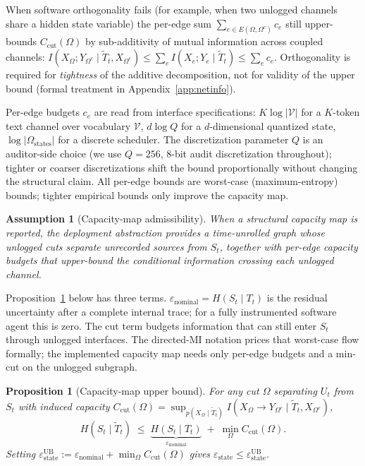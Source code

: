 \documentclass{article}
\newtheorem{proposition}{Proposition}
\newtheorem{assumption}{Assumption}
\begin{document}
  When software orthogonality fails (for example, when two unlogged channels
  share a hidden state variable) the per-edge sum $\sum_{e \in E(\Omega,
  \Omega^c)} c_e$ still upper-bounds $C_\text{cut}(\Omega)$ by sub-additivity of
   mutual information across coupled channels: $I(X_\Omega; Y_{\Omega^c} \mid
  \tilde T_t, X_{\Omega^c}) \leq \sum_e I(X_e; Y_e \mid \tilde T_t) \leq \sum_e
  c_e$. Orthogonality is required for \emph{tightness} of the additive
  decomposition, not for validity of the upper bound (formal treatment in
  Appendix~\ref{app:netinfo}).

  Per-edge budgets $c_e$ are read from interface specifications: $K \log
  |\mathcal{V}|$ for a $K$-token text channel over vocabulary $\mathcal{V}$, $d
  \log Q$ for a $d$-dimensional quantized state, $\log |\Omega_\text{states}|$
  for a discrete scheduler. The discretization parameter $Q$ is an auditor-side
  choice (we use $Q=256$, 8-bit audit discretization throughout); tighter or
  coarser discretizations shift the bound proportionally without changing the
  structural claim. All per-edge bounds are worst-case (maximum-entropy) bounds;
  tighter empirical bounds only improve the capacity map.

  \begin{assumption}[Capacity-map admissibility]
  When a structural capacity map is reported, the deployment abstraction provides
  a time-unrolled graph whose unlogged cuts separate unrecorded sources from
  $S_t$, together with per-edge capacity budgets that upper-bound the conditional
  information crossing each unlogged channel.
  \end{assumption}

  Proposition~\ref{prop:static-ub} below has three terms.
  $\varepsilon_\text{nominal} = H(S_t \mid T_t)$ is the residual uncertainty
  after a complete internal trace; for a fully instrumented software agent this
  is zero. The cut term budgets information that can still enter $S_t$ through
  unlogged interfaces. The directed-MI notation prices that worst-case flow
  formally; the implemented capacity map needs only per-edge budgets and a
  min-cut on the unlogged subgraph.

  \begin{proposition}[Capacity-map upper bound]
  \label{prop:static-ub} 
  For any cut $\Omega$ separating $U_t$ from $S_t$ with induced capacity
  $C_\text{cut}(\Omega) = \sup_{p(X_\Omega \mid \tilde T_t)} I(X_\Omega \to
  Y_{\Omega^c} \mid \tilde T_t, X_{\Omega^c})$,
  \[
    H(S_t \mid \tilde T_t) \;\leq\; \underbrace{H(S_t \mid
  T_t)}_{\varepsilon_\text{nominal}} \;+\; \min_{\Omega} C_\text{cut}(\Omega).
  \]
  Setting $\varepsilon_\text{state}^\text{UB} := \varepsilon_\text{nominal} +
  \min_\Omega C_\text{cut}(\Omega)$ gives $\varepsilon_\text{state} \leq
  \varepsilon_\text{state}^\text{UB}$. 
  \end{proposition}
\end{document}
